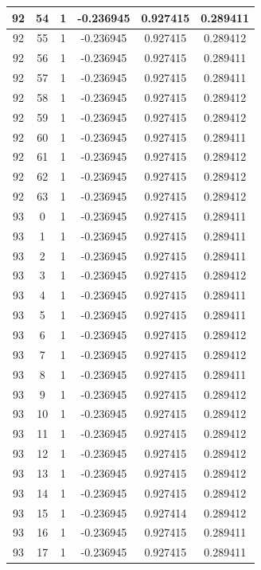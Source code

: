 \documentclass[12pt,a4paper]{article}
\numberwithin{equation}{section}
\numberwithin{figure}{section}
\numberwithin{table}{section}
\begin{document}
\begin{longtable}{|c|c|c|c|c|c|}
92 & 54 & 1 & -0.236945 & 0.927415 & 0.289411 \\ \hline
92 & 55 & 1 & -0.236945 & 0.927415 & 0.289412 \\ \hline
92 & 56 & 1 & -0.236945 & 0.927415 & 0.289411 \\ \hline
92 & 57 & 1 & -0.236945 & 0.927415 & 0.289411 \\ \hline
92 & 58 & 1 & -0.236945 & 0.927415 & 0.289412 \\ \hline
92 & 59 & 1 & -0.236945 & 0.927415 & 0.289412 \\ \hline
92 & 60 & 1 & -0.236945 & 0.927415 & 0.289411 \\ \hline
92 & 61 & 1 & -0.236945 & 0.927415 & 0.289412 \\ \hline
92 & 62 & 1 & -0.236945 & 0.927415 & 0.289412 \\ \hline
92 & 63 & 1 & -0.236945 & 0.927415 & 0.289412 \\ \hline
93 & 0 & 1 & -0.236945 & 0.927415 & 0.289411 \\ \hline
93 & 1 & 1 & -0.236945 & 0.927415 & 0.289411 \\ \hline
93 & 2 & 1 & -0.236945 & 0.927415 & 0.289411 \\ \hline
93 & 3 & 1 & -0.236945 & 0.927415 & 0.289412 \\ \hline
93 & 4 & 1 & -0.236945 & 0.927415 & 0.289411 \\ \hline
93 & 5 & 1 & -0.236945 & 0.927415 & 0.289411 \\ \hline
93 & 6 & 1 & -0.236945 & 0.927415 & 0.289412 \\ \hline
93 & 7 & 1 & -0.236945 & 0.927415 & 0.289412 \\ \hline
93 & 8 & 1 & -0.236945 & 0.927415 & 0.289411 \\ \hline
93 & 9 & 1 & -0.236945 & 0.927415 & 0.289412 \\ \hline
93 & 10 & 1 & -0.236945 & 0.927415 & 0.289412 \\ \hline
93 & 11 & 1 & -0.236945 & 0.927415 & 0.289412 \\ \hline
93 & 12 & 1 & -0.236945 & 0.927415 & 0.289412 \\ \hline
93 & 13 & 1 & -0.236945 & 0.927415 & 0.289412 \\ \hline
93 & 14 & 1 & -0.236945 & 0.927415 & 0.289412 \\ \hline
93 & 15 & 1 & -0.236945 & 0.927414 & 0.289412 \\ \hline
93 & 16 & 1 & -0.236945 & 0.927415 & 0.289411 \\ \hline
93 & 17 & 1 & -0.236945 & 0.927415 & 0.289411 \\ \hline

\end{longtable}
\end{document}
